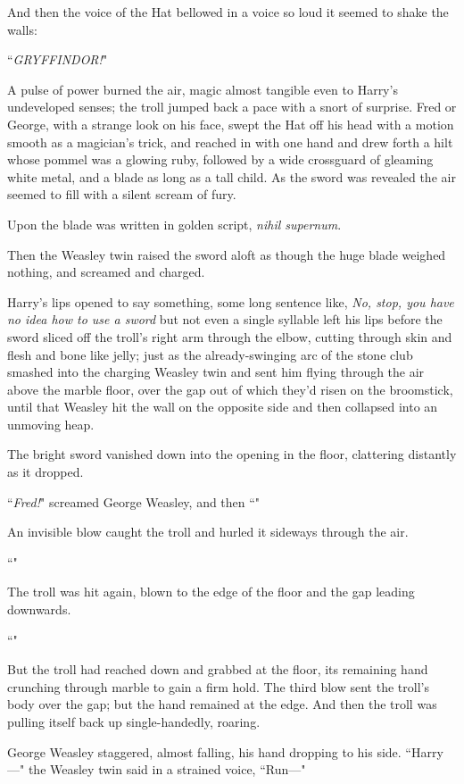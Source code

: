 And then the voice of the Hat bellowed in a voice so loud it seemed to shake the walls:

``\emph{GRYFFINDOR!}"

A pulse of power burned the air, magic almost tangible even to Harry's undeveloped senses; the troll jumped back a pace with a snort of surprise. Fred or George, with a strange look on his face, swept the Hat off his head with a motion smooth as a magician's trick, and reached in with one hand and drew forth a hilt whose pommel was a glowing ruby, followed by a wide crossguard of gleaming white metal, and a blade as long as a tall child. As the sword was revealed the air seemed to fill with a silent scream of fury.

Upon the blade was written in golden script, \emph{nihil supernum}.

Then the Weasley twin raised the sword aloft as though the huge blade weighed nothing, and screamed and charged.

Harry's lips opened to say something, some long sentence like, \emph{No, stop, you have no idea how to use a sword} but not even a single syllable left his lips before the sword sliced off the troll's right arm through the elbow, cutting through skin and flesh and bone like jelly; just as the already-swinging arc of the stone club smashed into the charging Weasley twin and sent him flying through the air above the marble floor, over the gap out of which they'd risen on the broomstick, until that Weasley hit the wall on the opposite side and then collapsed into an unmoving heap.

The bright sword vanished down into the opening in the floor, clattering distantly as it dropped.

``\emph{Fred!}" screamed George Weasley, and then ``"

An invisible blow caught the troll and hurled it sideways through the air.

``"

The troll was hit again, blown to the edge of the floor and the gap leading downwards.

``"

But the troll had reached down and grabbed at the floor, its remaining hand crunching through marble to gain a firm hold. The third blow sent the troll's body over the gap; but the hand remained at the edge. And then the troll was pulling itself back up single-handedly, roaring.

George Weasley staggered, almost falling, his hand dropping to his side. ``Harry---" the Weasley twin said in a strained voice, ``Run---"

